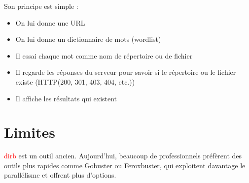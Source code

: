 \documentclass[11pt,a4paper]{book}
\begin{document}
Son principe est simple :
\begin{itemize}
    \item On lui donne une URL
    \item On lui donne un dictionnaire de mots (wordlist)
    \item Il essai chaque mot comme nom de répertoire ou de fichier
    \item Il regarde les réponses du serveur pour savoir si le répertoire ou le fichier existe (HTTP(200, 301, 403, 404, etc.))
    \item Il affiche les résultats qui existent
\end{itemize}

\section{Limites}
\textcolor{red}{dirb} est un outil ancien. Aujourd'hui, beaucoup de professionnels préfèrent des outils plus rapides comme Gobuster 
ou Feroxbuster, qui exploitent davantage le parallélisme et offrent plus d'options.
\end{document}

